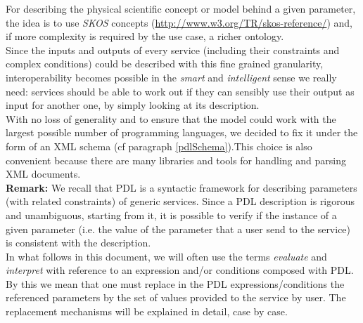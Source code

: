 \documentclass[a4paper,11pt] {ivoa}
\begin{document}
For describing the physical scientific concept or model behind a given parameter, the idea is to use
{\it SKOS} concepts
(\href{http://www.w3.org/TR/skos-reference/}{http://www.w3.org/TR/skos-reference/}) and, if more complexity is required by the use case, a richer ontology.\\

Since the inputs and outputs  of every service (including their constraints and complex conditions)
could be described with this fine grained granularity, interoperability becomes possible in the {\it
smart} and {\it intelligent} sense we really need: services should be able to work out if they can
sensibly use their output as input for another one, by simply looking at its description.\\

With no loss of generality and to ensure that the model could work with the largest possible number
of programming languages, we decided to fix it under the form of an XML schema (cf paragraph \ref{pdlSchema}).This choice is also
convenient because there are many libraries and tools for handling and parsing XML documents.\\

{\bf Remark:} We recall that PDL is a syntactic framework for describing parameters (with related
constraints) of generic services. Since a PDL description is rigorous and unambiguous, starting from
it, it is possible to verify if the instance of a given parameter (i.e. the value of the parameter
that a user send to the service) is consistent with the description.\\
In what follows in this document, we will often use the terms {\it evaluate} and {\it interpret}
with reference to an expression and/or conditions composed with PDL. By this we mean that one must
replace in the PDL expressions/conditions the referenced parameters  by the set of values provided to the
service by user. The replacement mechanisms will be explained in detail, case by case.
\end{document}
